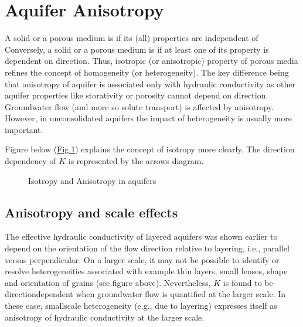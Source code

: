 \documentclass[letterpaper,10pt,english]{jupyterBook}
\begin{document}
\section{Aquifer Anisotropy}
\label{\detokenize{content/flow/L5/15_het_iso:aquifer-anisotropy}}
\sphinxAtStartPar
A solid or a porous medium is  if its (all) properties are independent of  Conversely, a solid or a porous medium is  if at least one of its property is dependent on direction. Thus, isotropic (or anisotropic) property of porous media refines the concept of homogeneity (or heterogeneity). The key difference being that anisotropy of aquifer is associated only with hydraulic conductivity as other aquifer properties like storativity or porosity cannot depend on direction. Groundwater flow (and more so solute transport) is affected by anisotropy. However, in unconsolidated aquifers the impact of heterogeneity is usually more important.

\sphinxAtStartPar
Figure below (\hyperref[\detokenize{content/flow/L5/15_het_iso:iso-anisotropy}]{Fig.\@ \ref{\detokenize{content/flow/L5/15_het_iso:iso-anisotropy}}}) explains the concept of isotropy more clearly. The direction dependency of \(K\) is represented by the arrows diagram.

\begin{figure}[htbp]
\centering
\capstart

\noindent{}
\caption{Isotropy and Anisotropy in aquifers}\label{\detokenize{content/flow/L5/15_het_iso:iso-anisotropy}}\end{figure}


\subsection{Anisotropy and scale effects}
\label{\detokenize{content/flow/L5/15_het_iso:anisotropy-and-scale-effects}}
\sphinxAtStartPar
The effective hydraulic conductivity of layered aquifers was shown earlier to depend on the orientation of the flow direction relative to layering, i.e., parallel versus perpendicular. On a larger scale, it may not be possible to identify or resolve heterogeneities associated with example thin layers, small lenses, shape and orientation of grains (see figure above). Nevertheless, \(K\) is found to be direction\sphinxhyphen{}dependent when groundwater flow is quantified at the larger scale. In these case, small\sphinxhyphen{}scale heterogeneity (e.g., due to layering) expresses itself as anisotropy of hydraulic conductivity at the larger scale.
\end{document}
